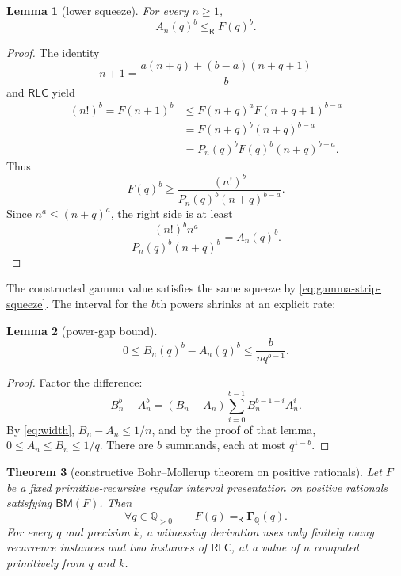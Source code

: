\documentclass[11pt]{article}
\newtheorem{theorem}{Theorem}[section]
\newtheorem{lemma}[theorem]{Lemma}
\newcommand{\Q}{\mathbb Q}
\newcommand{\Gam}{\boldsymbol\Gamma}
\newcommand{\Eq}{\mathrel{=_{\!\mathsf R}}}
\newcommand{\Le}{\mathrel{\le_{\!\mathsf R}}}
\newcommand{\RLC}{\mathsf{RLC}}
\newcommand{\BM}{\mathsf{BM}}
\begin{document}
\begin{lemma}[lower squeeze]
For every $n\ge1$,
\begin{equation}
 A_n(q)^b\Le F(q)^b.
 \label{eq:lower-squeeze}
\end{equation}
\end{lemma}

\begin{proof}
The identity
\[
 n+1=\frac{a(n+q)+(b-a)(n+q+1)}b
\]
and $\RLC$ yield
\begin{align*}
 (n!)^b=F(n+1)^b
 &\le F(n+q)^aF(n+q+1)^{b-a}\\
 &=F(n+q)^b(n+q)^{b-a}\\
 &=P_n(q)^bF(q)^b(n+q)^{b-a}.
\end{align*}
Thus
\[
 F(q)^b\ge\frac{(n!)^b}{P_n(q)^b(n+q)^{b-a}}.
\]
Since $n^a\le(n+q)^a$, the right side is at least
\[
 \frac{(n!)^b n^a}{P_n(q)^b(n+q)^b}=A_n(q)^b.
\]
\end{proof}

The constructed gamma value satisfies the same squeeze by
\eqref{eq:gamma-strip-squeeze}.  The interval for the $b$th powers shrinks at
an explicit rate:
\begin{lemma}[power-gap bound]
\begin{equation}
 0\le B_n(q)^b-A_n(q)^b
 \le \frac{b}{nq^{b-1}}.
 \label{eq:power-gap}
\end{equation}
\end{lemma}

\begin{proof}
Factor the difference:
\[
 B_n^b-A_n^b=(B_n-A_n)
 \sum_{i=0}^{b-1}B_n^{b-1-i}A_n^i.
\]
By \eqref{eq:width}, $B_n-A_n\le1/n$, and by the proof of that lemma,
$0\le A_n\le B_n\le1/q$.  There are $b$ summands, each at most
$q^{1-b}$.
\end{proof}

\begin{theorem}[constructive Bohr--Mollerup theorem on positive rationals]
Let $F$ be a fixed primitive-recursive regular interval presentation on
positive rationals satisfying $\BM(F)$.  Then
\[
 \forall q\in\Q_{>0}\qquad F(q)\Eq\Gam_{\Q}(q).
\]
For every $q$ and precision $k$, a witnessing derivation uses only finitely
many recurrence instances and two instances of $\RLC$, at a value of $n$
computed primitively from $q$ and $k$.
\end{theorem}
\end{document}
